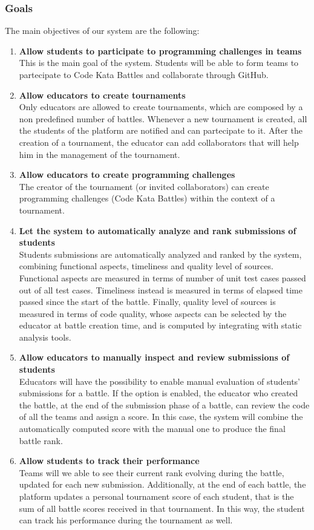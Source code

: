  \subsubsection{Goals}
 \label{goals}
 The main objectives of our system are the following:
 \begin{enumerate}[label=$\bullet$ \textbf{G\arabic*:}]
     \item \textbf{ Allow students to participate to programming challenges in teams}\\This is the main goal of the system. Students will be able to form teams to partecipate to Code Kata Battles and collaborate through GitHub.
     \item \textbf { Allow educators to create tournaments}\\Only educators are allowed to create tournaments, which are composed by a non predefined number of battles. Whenever a new tournament is created, all the students of the platform are notified and can partecipate to it. After the creation of a tournament, the educator can add collaborators that will help him in the management of the tournament.
     \item \textbf{ Allow educators to create programming challenges}\\The creator of the tournament (or invited collaborators) can create programming challenges (Code Kata Battles) within the context of a tournament.
     \item \textbf{ Let the system to automatically analyze and rank submissions of students}\\Students submissions are automatically analyzed and ranked by the system, combining functional aspects, timeliness and quality level of sources. Functional aspects are measured in terms of number of unit test cases passed out of all test cases. Timeliness instead is measured in terms of elapsed time passed since the start of the battle. Finally, quality level of sources is measured in terms of code quality, whose aspects can be selected by the educator at battle creation time, and is computed by integrating with static analysis tools.
     \item \textbf{ Allow educators to manually inspect and review submissions of students}\\Educators will have the possibility to enable manual evaluation of students' submissions for a battle. If the option is enabled, the educator who created the battle, at the end of the submission phase of a battle, can review the code of all the teams and assign a score. In this case, the system will combine the automatically computed score with the manual one to produce the final battle rank.
     \item \textbf{ Allow students to track their performance}\\Teams will we able to see their current rank evolving during the battle, updated for each new submission. Additionally, at the end of each battle, the platform updates a personal tournament score of each student, that is the sum of all battle scores received in that tournament. In this way, the student can track his performance during the tournament as well.
 \end{enumerate}
\newpage

